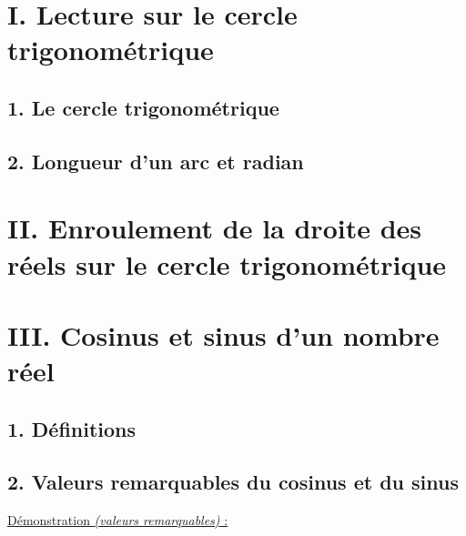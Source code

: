 \documentclass[11pt,a4paper]{article}
\title{\doctitre}
\author{\docniveau \\ \doctheme\text{ - }\doctype}
\date{}
\begin{document}
\maketitle
\pagestyle{custom}
\thispagestyle{custom}

\section*{I. Lecture sur le cercle trigonométrique}

\subsection*{1. Le cercle trigonométrique}

\subsection*{2. Longueur d'un arc et radian}


\section*{II. Enroulement de la droite des réels sur le cercle trigonométrique}

\section*{III. Cosinus et sinus d'un nombre réel}

\subsection*{1. Définitions}

\subsection*{2. Valeurs remarquables du cosinus et du sinus}

\underline{Démonstration \emph{(valeurs remarquables)} :}
\end{document}
